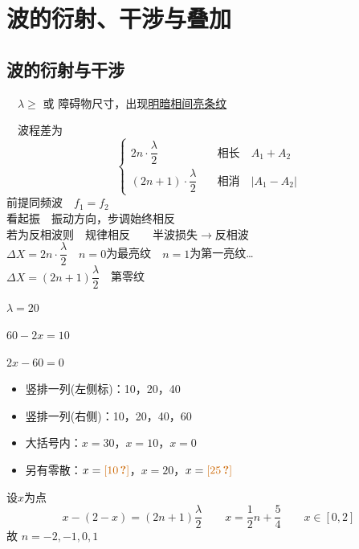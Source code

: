 \section{波的衍射、干涉与叠加}
\subsection{波的衍射与干涉}
　$\lambda\ge$ 或 \unclear{$\approx$} 障碍物尺寸，出现\underline{明暗相间亮条纹}

　波程差为
\[
\left\{\begin{aligned}
2n\cdot\dfrac{\lambda}{2}&\quad\text{相长}\quad A_1+A_2\\
(2n+1)\cdot\dfrac{\lambda}{2}&\quad\text{相消}\quad |A_1-A_2|
\end{aligned}\right.
\]
前提同频波　$f_1=f_2$\\
看起振　振动方向，步调始终相反\\
若为反相波则　规律相反　　半波损失$\to$反相波\\[1ex]
$\Delta X=2n\cdot\dfrac{\lambda}{2}$　$n=0$为最亮纹　$n=1$为第一亮纹…\\[1ex]
$\Delta X=(2n+1)\dfrac{\lambda}{2}$　第零纹 %


$\lambda=20$ %

$60-2x=10$\ 

$2x-60=0$

\begin{itemize}
\item 竖排一列(左侧标)：10，20，40
\item 竖排一列(右侧)：10，20，40，60
\item 大括号内：$x=30$，$x=10$，$x=0$
\item 另有零散：$x=\unclear{10}$，$x=20$，$x=\unclear{25}$ %
\end{itemize}

\begin{problem}[3]
\begin{solution}
设$x$为点
\[ x-(2-x)=(2n+1)\frac{\lambda}{2} \qquad x=\frac{1}{2}n+\frac{5}{4} \qquad x\in[0,2] \]
故 $n=-2,-1,0,1$
\end{solution}
\end{problem}

